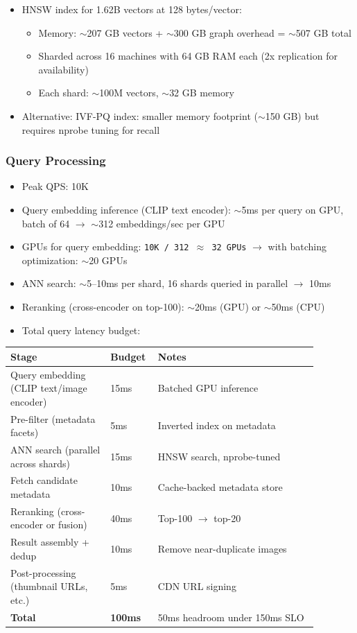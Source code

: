 \begin{itemize}
  \item HNSW index for 1.62B vectors at 128 bytes/vector:
  \begin{itemize}
    \item Memory: $\sim$207 GB vectors + $\sim$300 GB graph overhead = $\sim$507 GB total
    \item Sharded across 16 machines with 64 GB RAM each (2x replication for availability)
    \item Each shard: $\sim$100M vectors, $\sim$32 GB memory
  \end{itemize}
  \item Alternative: IVF-PQ index: smaller memory footprint ($\sim$150 GB) but requires nprobe tuning for recall
\end{itemize}

\subsubsection*{Query Processing}

\begin{itemize}
  \item Peak QPS: 10K
  \item Query embedding inference (CLIP text encoder): $\sim$5ms per query on GPU, batch of 64 $\rightarrow$ $\sim$312 embeddings/sec per GPU
  \item GPUs for query embedding: \texttt{10K / 312 $\approx$ 32 GPUs} $\rightarrow$ with batching optimization: $\sim$20 GPUs
  \item ANN search: $\sim$5--10ms per shard, 16 shards queried in parallel $\rightarrow$ 10ms
  \item Reranking (cross-encoder on top-100): $\sim$20ms (GPU) or $\sim$50ms (CPU)
  \item Total query latency budget:
\end{itemize}

\begin{tabular}{|p{0.30\linewidth}|p{0.10\linewidth}|p{0.48\linewidth}|}
\hline
\textbf{Stage} & \textbf{Budget} & \textbf{Notes} \\
\hline
Query embedding (CLIP text/image encoder) & 15ms & Batched GPU inference \\
\hline
Pre-filter (metadata facets) & 5ms & Inverted index on metadata \\
\hline
ANN search (parallel across shards) & 15ms & HNSW search, nprobe-tuned \\
\hline
Fetch candidate metadata & 10ms & Cache-backed metadata store \\
\hline
Reranking (cross-encoder or fusion) & 40ms & Top-100 $\rightarrow$ top-20 \\
\hline
Result assembly + dedup & 10ms & Remove near-duplicate images \\
\hline
Post-processing (thumbnail URLs, etc.) & 5ms & CDN URL signing \\
\hline
\textbf{Total} & \textbf{100ms} & 50ms headroom under 150ms SLO \\
\hline
\end{tabular}

